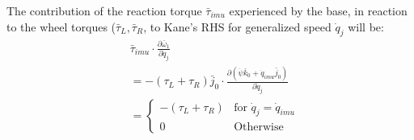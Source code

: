 \documentclass[a4paper,10pt]{article}
\begin{document}
The contribution of the reaction torque $\bar\tau_{imu}$ experienced by the base, in reaction to the wheel torques ($\bar\tau_L, \bar\tau_R$, to Kane's RHS for generalized speed $\dot{q}_j$ will be:
\begin{align}
 &\bar\tau_{imu} \cdot \frac{\partial \bar\omega_1 }{\partial \dot{q}_j} \label{tauImu1} \\
 &= -\left(\tau_L+\tau_R\right)\bar{j}_0 \cdot \frac{\partial \left( \dot\psi\bar{k}_0 + \dot{q}_{imu}\bar{j}_0  \right) }{\partial \dot{q}_j}  \nonumber \\
 &= \begin{cases}
     -\left(\tau_L+\tau_R\right) & \mbox{for } \dot{q}_j = \dot{q}_{imu} \\
     0 & \mbox{Otherwise}
    \end{cases} \label{tauImu2}
\end{align}
\end{document}
